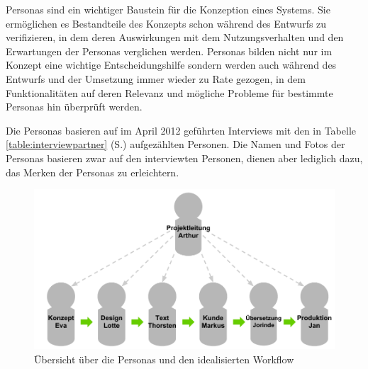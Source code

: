 Personas sind ein wichtiger Baustein für die Konzeption eines Systems. Sie ermöglichen es Bestandteile des Konzepts schon während des Entwurfs zu verifizieren, in dem deren Auswirkungen mit dem Nutzungsverhalten und den Erwartungen der Personas verglichen werden. Personas bilden nicht nur im Konzept eine wichtige Entscheidungshilfe sondern werden auch während des Entwurfs und der Umsetzung immer wieder zu Rate gezogen, in dem Funktionalitäten auf deren Relevanz und mögliche Probleme für bestimmte Personas hin überprüft werden. \cite[S.38 ff.]{cohn2004user}

Die Personas basieren auf im April 2012 geführten Interviews mit den in Tabelle \ref{table:interviewpartner} (S.\pageref{table:interviewpartner}) aufgezählten Personen. Die Namen und Fotos der Personas basieren zwar auf den interviewten Personen, dienen aber lediglich dazu, das Merken der Personas zu erleichtern. 

\begin{figure}[htb]
\begin{center}
\includegraphics[width=\textwidth]{media/Uebersicht-Personas.pdf}
\caption{Übersicht über die Personas und den idealisierten Workflow}
\label{chart:uebersicht-personas}
\end{center}
\end{figure}


